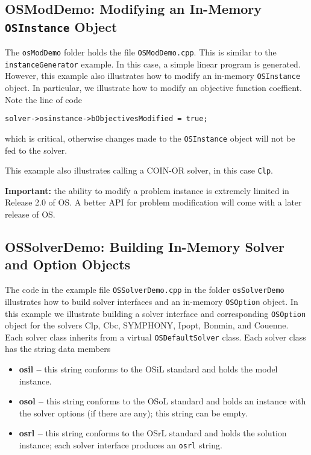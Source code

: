 \documentclass[11pt]{article}
\renewcommand{\{}{{\char"7B}}
\renewcommand{\}}{{\char"7D}}
\renewcommand{\^}{{\char"0D}}
\renewcommand{\'}{{\char"0D}}
\begin{document}
\subsection{OSModDemo: Modifying an In-Memory {\tt OSInstance} Object}\label{section:exampleOSModDemo}

The {\tt osModDemo} folder holds the file {\tt OSModDemo.cpp}. This is similar to the 
{\tt instanceGenerator} example. In this case, a simple linear program is generated. However, 
this example also illustrates how to modify an in-memory {\tt OSInstance} object. 
In particular, we illustrate how to modify an objective function coeffient. Note the line of code 

\begin{verbatim}
solver->osinstance->bObjectivesModified = true;
\end{verbatim}
which is critical, otherwise changes made to the {\tt OSInstance} object will not be fed to the solver. 

This example also illustrates calling a COIN-OR solver,
in this case {\tt Clp}.

\vskip 8pt

{\bf Important:} the ability to modify a problem instance is extremely limited in Release 2.0 of OS. 
A better API for problem modification will come with a later release of OS.



\subsection{OSSolverDemo: Building In-Memory Solver and Option Objects}\label{section:exampleOSSolverDemo}

The code in the  example file {\tt OSSolverDemo.cpp} in the folder {\tt osSolverDemo}  
illustrates  how to build solver interfaces and  an in-memory {\tt OSOption} object. 
In this example we  illustrate building a solver interface and corresponding {\tt OSOption} 
object for the solvers Clp, Cbc, SYMPHONY, Ipopt,   Bonmin, and Couenne.   
Each solver class inherits from a virtual {\tt OSDefaultSolver} class. 
Each solver class has the string data members

\begin{itemize}
\item {\bf osil --} this string conforms to the OSiL standard and holds the model instance.

\item {\bf osol --} this string conforms to the OSoL standard and holds an instance with the 
solver options (if there are any); this string can be empty.

\item {\bf osrl --} this string conforms to the OSrL standard and holds the solution instance; 
each solver interface produces an {\tt osrl} string.
\end{itemize}
\end{document}
